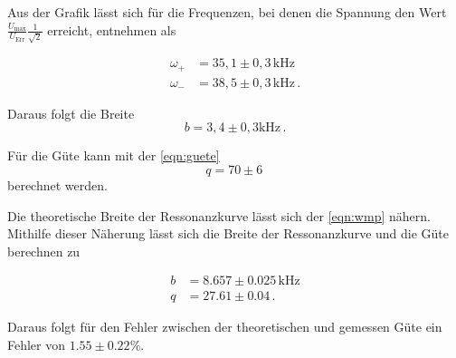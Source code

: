 \noindent
Aus der Grafik lässt sich für die Frequenzen, bei denen die Spannung den Wert $\frac{U_\text{max}}{U_\text{Err}}\frac{1}{\sqrt{2}}$ erreicht, entnehmen als

\begin{align*}
    \omega_+ &= 35,1 \pm 0,3 \,  \si{\kilo\hertz} \\
    \omega_- &= 38,5 \pm 0,3 \,  \si{\kilo\hertz} \, .
\end{align*}

\noindent
Daraus folgt die Breite 
\begin{equation*}
    b = 3,4 \pm 0,3 \si{\kilo\hertz} \, .
\end{equation*}

\noindent
Für die Güte kann mit der \autoref{eqn:guete} $$ q = 70 \pm 6 \, $$ berechnet werden. 

\noindent
Die theoretische Breite der Ressonanzkurve lässt sich der \autoref{eqn:wmp} nähern. Mithilfe dieser Näherung lässt sich die Breite der Ressonanzkurve und die Güte berechnen zu %

\begin{align*}
    b & = 8.657 \pm 0.025 \, \si{\kilo\hertz}\\
    q & = 27.61\pm 0.04 \, . 
\end{align*}

\noindent
Daraus folgt für den Fehler zwischen der theoretischen und gemessen Güte ein Fehler von $1.55 \pm 0.22 \si{\percent}$.


